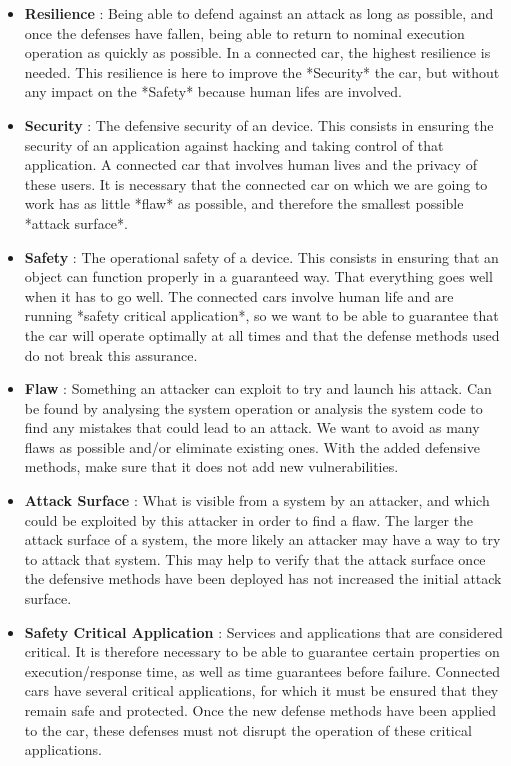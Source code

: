 \begin{itemize}

\item \textbf{Resilience} \label{resilience} : Being able to defend against an attack as long as
possible, and once the defenses have fallen, being able to return to
nominal execution operation as quickly as possible. In a connected
car, the highest resilience is needed. This resilience is here to
improve the *Security* the car, but without any impact on the *Safety*
because human lifes are involved.

\item \textbf{Security} : The defensive security of an device. This consists in
ensuring the security of an application against hacking and taking
control of that application.  A connected car that involves human
lives and the privacy of these users. It is necessary that the
connected car on which we are going to work has as little *flaw* as
possible, and therefore the smallest possible *attack surface*.

\item \textbf{Safety} : The operational safety of a device. This consists in
ensuring that an object can function properly in a guaranteed
way. That everything goes well when it has to go well. The connected
cars involve human life and are running *safety critical application*, so
we want to be able to guarantee that the car will operate optimally at
all times and that the defense methods used do not break this
assurance.

\item \textbf{Flaw} : Something an attacker can exploit to try and launch his
attack. Can be found by analysing the system operation or analysis the
system code to find any mistakes that could lead to an attack. We want
to avoid as many flaws as possible and/or eliminate existing
ones. With the added defensive methods, make sure that it does not add
new vulnerabilities.

\item \textbf{Attack Surface} : What is visible from a system by an attacker,
and which could be exploited by this attacker in order to find a flaw.
The larger the attack surface of a system, the more likely an attacker
may have a way to try to attack that system. This may help to verify
that the attack surface once the defensive methods have been deployed
has not increased the initial attack surface.

\item \textbf{Safety Critical Application} : Services and applications that are
considered critical. It is therefore necessary to be able to guarantee
certain properties on execution/response time, as well as time
guarantees before failure.  Connected cars have several critical
applications, for which it must be ensured that they remain safe and
protected. Once the new defense methods have been applied to the car,
these defenses must not disrupt the operation of these critical
applications.


\end{itemize}
